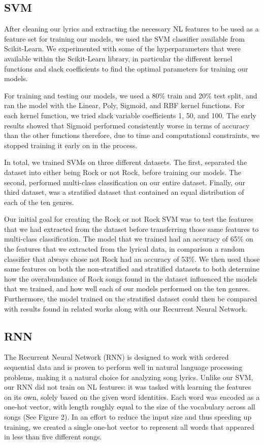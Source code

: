 \documentclass[journal]{IEEEtran}
\begin{document}
\subsection{SVM}

After cleaning our lyrics and extracting the necessary NL features to be used as a feature set for training our models, we used the SVM classifier available from Scikit-Learn. We experimented with some of the hyperparameters that were available within the Scikit-Learn library, in particular the different kernel functions and slack coefficients to find the optimal parameters for training our models.

For training and testing our models, we used a 80\% train and 20\% test split, and ran the model with the Linear, Poly, Sigmoid, and RBF kernel functions. For each kernel function, we tried slack variable coefficients 1, 50, and 100. The early results showed that Sigmoid performed consistently worse in terms of accuracy than the other functions therefore, due to time and computational constraints, we stopped training it early on in the process.

	In total, we trained SVMs on three different datasets. The first, separated the dataset into either being Rock or not Rock, before training our models. The second, performed multi-class classification on our entire dataset. Finally, our third dataset, was a stratified dataset that contained an equal distribution of each of the ten genres.
	
	Our initial goal for creating the Rock or not Rock SVM was to test the features that we had extracted from the dataset before transferring those same features to multi-class classification. The model that we trained had an accuracy of 65\% on the features that we extracted from the lyrical data, in comparison a random classifier that always chose not Rock had an accuracy of 53\%. We then used those same features on both the non-stratified and stratified datasets to both determine how the overabundance of Rock songs found in the dataset influenced the models that we trained, and how well each of our models performed on the ten genres. Furthermore, the model trained on the stratified dataset could then be compared with results found in related works along with our Recurrent Neural Network.  

\subsection{RNN}

The Recurrent Neural Network (RNN) is designed to work with ordered sequential data and is proven to perform well in natural language processing problems, making it a natural choice for analyzing song lyrics. Unlike our SVM, our RNN did not train on NL features: it was tasked with learning the features on its own, solely based on the given word identities. Each word was encoded as a one-hot vector, with length roughly equal to the size of the vocabulary across all songs (See Figure 2). In an effort to reduce the input size and thus speeding up training, we created a single one-hot vector to represent all words that appeared in less than five different songs.
\end{document}
